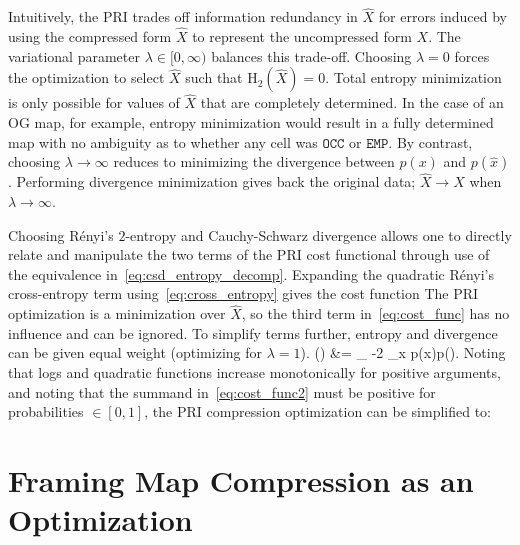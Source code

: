 Intuitively, the PRI trades off information redundancy in $\hat{X}$ for
errors induced by using the compressed form $\hat{X}$ to
represent the uncompressed form $X$. The variational parameter $\lambda \in [0,
 \infty)$ balances this trade-off. Choosing $\lambda=0$ forces the optimization
to select $\hat{X}$ such that $\text{H}_{2}(\hat{X}) = 0$. Total entropy minimization is
only possible for values of $\hat{X}$ that are completely determined. In the case of an
OG map, for example, entropy minimization would result in a fully determined map with no
ambiguity as to whether any cell was $\texttt{OCC}$ or $\texttt{EMP}$. By contrast, choosing $\lambda
\rightarrow \infty$ reduces to minimizing the divergence between $p(x)$ and
$p(\hat{x})$. Performing divergence minimization gives back the original data;
$\hat{X} \rightarrow X$ when $\lambda \rightarrow \infty$.

Choosing R\'{e}nyi's $2$-entropy and Cauchy-Schwarz divergence allows one to
directly relate and manipulate the two terms of the PRI cost functional through
use of  the equivalence in~\eqref{eq:csd_entropy_decomp}.
%
%
Expanding the quadratic R\'{e}nyi's cross-entropy term
using~\eqref{eq:cross_entropy} gives the cost function
%
%
The PRI optimization is a minimization over $\hat{X}$, so the third term
in~\eqref{eq:cost_func} has no influence and can be ignored. To simplify terms
further, entropy and divergence can be given equal weight (optimizing for
$\lambda=1$).
%
\eq
{
  \Lambda()
  &=
  \min_{}
  -2 \log \sum_{x \in {}}
  p(x)p().
  \label{eq:cost_func2}
}
%
Noting that logs and quadratic functions increase monotonically for positive arguments,
and noting that the summand in~\eqref{eq:cost_func2} must be positive for
probabilities $\in [0, 1]$,
the PRI compression optimization can be simplified to:
%


\section{Framing Map Compression as an Optimization}
\label{sec:pri_framing}

